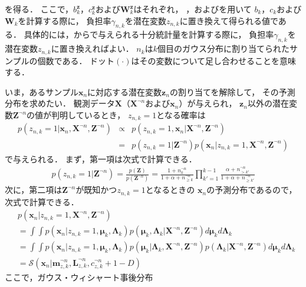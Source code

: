 を得る．
ここで，$b_k^{\bm{z}}$，$c_k^{\bm{z}}$および$\bm{W}_k^{\bm{z}}$はそれぞれ，
，およびを用いて
$b_k$，$c_k$および$\bm{W}_k$を計算する際に，
負担率$\gamma_{n,k}$を潜在変数$z_{n,k}$に置き換えて得られる値である．
具体的には，からで与えられる十分統計量を計算する際に，
負担率$\gamma_{n,k}$を潜在変数$z_{n,k}$に置き換えればよい．
$n_{k}$は$k$個目のガウス分布に割り当てられたサンプルの個数である．
ドット$(\cdot)$はその変数について足し合わせることを意味する．
\newpage

いま，あるサンプル$\bm{x}_{n}$に対応する潜在変数$\bm{z}_{n}$の割り当てを解除して，
その予測分布を求めたい．
観測データ$\bm{X}$（$\bm{X}^{\neg{n}}$および$\bm{x}_n$）が与えられ，
$\bm{z}_{n}$以外の潜在変数$\bm{Z}^{\neg{n}}$の値が判明しているとき，
$z_{n,k}=1$となる確率は
\begin{eqnarray}
 p(z_{n,k}=1 | \bm{x}_{n}, \bm{X}^{\neg{n}}, \bm{Z}^{\neg{n}})
  &\propto&
 p(z_{n,k}=1, \bm{x}_{n} | \bm{X}^{\neg{n}}, \bm{Z}^{\neg{n}})
 \nonumber\\
  &=&
 p(z_{n,k}=1 | \bm{Z}^{\neg{n}})
 p(\bm{x}_{n} | z_{n,k}=1, \bm{X}^{\neg{n}}, \bm{Z}^{\neg{n}})
\end{eqnarray}
で与えられる．
まず，第一項は次式で計算できる．
\begin{eqnarray}
 p(z_{n,k}=1 | \bm{Z}^{\neg{n}})
  =
 \frac{p(\bm{Z})}{p(\bm{Z}^{\neg{n}})}
  = 
 \frac{1 + n_k^{\neg{n}}}
      {1 + \alpha + n_{\ge k}^{\neg{n}}}     
 \prod_{k'=1}^{k-1}
 \frac{\alpha + n_{> k'}^{\neg{n}}}
      {1 + \alpha + n_{\ge k'}^{\neg{n}}}
\end{eqnarray}
次に，第二項は$\bm{Z}^{\neg{n}}$が既知かつ$z_{n,k}=1$となるときの
$\bm{x}_{n}$の予測分布であるので，次式で計算できる．
\begin{align}
& 
p(\bm{x}_{n} | z_{n,k}=1, \bm{X}^{\neg{n}}, \bm{Z}^{\neg{n}})
\nonumber\\
&=
\int\!\!\!\!\int
p(\bm{x}_{n} | z_{n,k}=1, \bm\mu_k, \bm\Lambda_k)
p(\bm\mu_k,\bm\Lambda_k | \bm{X}^{\neg{n}}, \bm{Z}^{\neg{n}})
d\bm\mu_k d\bm\Lambda_k
\nonumber\\
&=
\int\!\!\!\!\int
p(\bm{x}_{n} | z_{n,k}=1, \bm\mu_k,\bm\Lambda_k)
p(\bm\mu_k|\bm\Lambda_k,\bm{X}^{\neg{n}}, \bm{Z}^{\neg{n}})
p(\bm\Lambda_k|\bm{X}^{\neg{n}}, \bm{Z}^{\neg{n}})
d\bm\mu_k d\bm\Lambda_k
\nonumber\\
&=
 \mathcal{S}\left(\bm{x}_{n}|\bm{m}_{z,k}^{\neg{n}}, 
	     \bm{L}_{z,k}^{\neg{n}}, c_{z,k}^{\neg{n}} + 1 - D \right)
\end{align}
ここで，ガウス・ウィシャート事後分布
